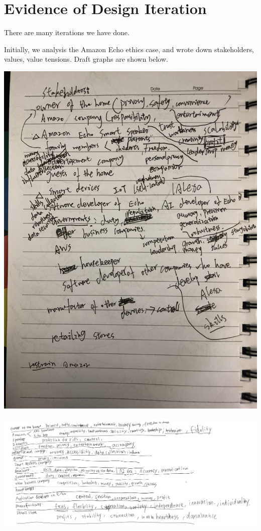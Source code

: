 \documentclass{article}
\begin{document}
\section{Evidence of Design Iteration}

There are many iterations we have done.

Initially, we analysis the Amazon Echo ethics case, and wrote down stakeholders, values, value tensions. Draft graphs are shown below.

\includegraphics[scale=0.3]{values_1.jpeg}

\includegraphics[scale=0.3]{values_2.png}
\end{document}
